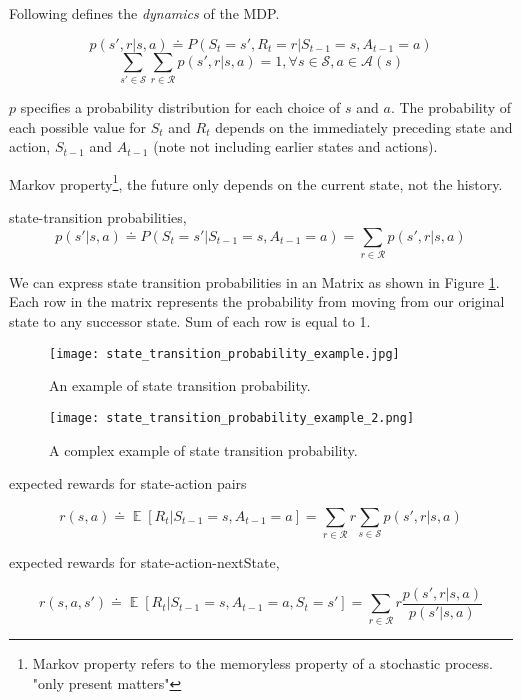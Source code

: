 \documentclass[lang=en,mode=geye,device=normal,color=blue,14pt]{elegantnote}
\DeclareMathOperator*{\E}{\mathbb{E}}
\DeclareMathOperator*{\1}{\mathbbm{1}}
\begin{document}
Following defines the \textit{dynamics} of the MDP.

$$ p(s', r| s, a) \doteq P(S_t = s', R_t = r | S_{t-1} = s, A_{t-1} = a) $$
$$ \sum_{s' \in \mathcal{S}} \sum_{r \in \mathcal{R}} p(s',r|s,a) = 1, \forall s \in \mathcal{S}, a \in \mathcal{A}(s) $$

$p$ specifies a probability distribution for each choice of $s$ and $a$.
The probability of each possible value for $S_t$ and $R_t$ depends on the immediately preceding state and action, $S_{t-1}$ and $A_{t-1}$ (note not including earlier states and actions).

\begin{definition}
Markov property\footnote{Markov property refers to the memoryless property of a stochastic process. "only present matters"}, the future only depends on the current state, not the history.
\end{definition}

\begin{definition}
state-transition probabilities,
$$ p(s'|s,a) \doteq P(S_t=s'|S_{t-1}=s, A_{t-1}=a) = \sum_{r\in \mathcal{R}} p(s',r|s,a) $$
\end{definition}
We can express state transition probabilities in an Matrix as shown in Figure \ref{fig:state-trans-prob-eg}. Each row in the matrix represents the probability from moving from our original state to any successor state. Sum of each row is equal to 1.
\begin{figure}[h!]
  \texttt{[image: state\_transition\_probability\_example.jpg]}
  \caption{An example of state transition probability.}
  \label{fig:state-trans-prob-eg}
\end{figure}

\begin{figure}[h!]
  \texttt{[image: state\_transition\_probability\_example\_2.png]}
  \caption{A complex example of state transition probability.}
  \label{fig:state-trans-prob-eg2}
\end{figure}

\begin{definition}
expected rewards for state-action pairs

$$ r(s,a) \doteq \E [R_t | S_{t-1}=s, A_{t-1}=a] = \sum_{r\in \mathcal{R}} r \sum_{s\in \mathcal{S}} p(s',r|s,a) $$
\end{definition}

\begin{definition}
expected rewards for state-action-nextState,

$$ r(s,a,s') \doteq \E [R_t | S_{t-1}=s, A_{t-1}=a, S_t=s'] = \sum_{r \in \mathcal{R}} r \frac{p(s',r|s,a)}{p(s'|s,a)} $$
\end{definition}
\end{document}
